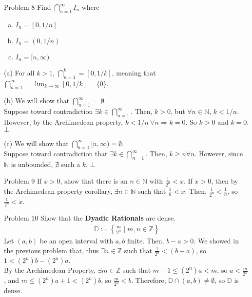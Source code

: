 \documentclass[9pt]{extarticle}
\newcommand{\N}{\mathbb{N}}
\newcommand{\Z}{\mathbb{Z}}
\begin{document}
  \begin{problem}{Problem 8}
    Find $\bigcap_{n = 1}^{\infty} I_n$ where
    \begin{enumerate}[(a)]
      \item $I_n = [0,1/n]$
      \item $I_n = (0,1/n)$
      \item $I_n = [n,\infty)$
    \end{enumerate}
    \tcblower
    \begin{problem}{(a)}
      For all $k > 1$, $\bigcap_{n=1}^{k} = [0,1/k]$, meaning that $\bigcap_{n=1}^{\infty} = \lim_{k\rightarrow\infty}[0,1/k] = \{0\}$.
    \end{problem}
    \begin{problem}{(b)}
      We will show that $\bigcap_{n=1}^{\infty} = \emptyset$.\\

      Suppose toward contradiction $\exists k\in \bigcap_{n=1}^{\infty}$. Then, $k > 0$, but $\forall n\in \N$, $k < 1/n$. However, by the Archimedean property, $k < 1/n~\forall n \Rightarrow k=0$. So $k > 0$ and $k = 0$. $\bot$
    \end{problem}
    \begin{problem}{(c)}
      We will show that $\bigcap_{n=1}^{\infty} [n,\infty) = \emptyset$.\\

      Suppose toward contradiction that $\exists k \in \bigcap_{n=1}^{\infty}$. Then, $k \geq n \forall n$. However, since $\N$ is unbounded, $\nexists$ such a $k$. $\bot$
    \end{problem}
  \end{problem}
  \begin{problem}{Problem 9}
    If $x > 0$, show that there is an $n\in\N$ with $\frac{1}{2^n} < x$.
    \tcblower
    If $x > 0$, then by the Archimedean property corollary, $\exists n\in\N$ such that $\frac{1}{n} < x$. Then, $\frac{1}{2^n} < \frac{1}{n}$, so $\frac{1}{2^n} < x$.
  \end{problem}
  \begin{problem}{Problem 10}
    Show that the \textbf{Dyadic Rationals} are dense.
    \begin{align*}
      \mathbb{D} := \left\{\frac{m}{2^n}\mid m,n\in\Z\right\}
    \end{align*}
    \tcblower
    Let $(a,b)$ be an open interval with $a,b$ finite. Then, $b-a > 0$. We showed in the previous problem that, thus $\exists n\in\Z$ such that $\frac{1}{2^n} < (b-a)$, so $1 < (2^n)b - (2^n)a$.\\

    By the Archimedean Property, $\exists m\in\Z$ such that $m-1 \leq (2^n)a < m$, so $a < \frac{m}{2^n}$, and $m \leq (2^n)a + 1 < (2^n)b$, so $\frac{m}{2^n} < b$. Therefore, $\mathbb{D} \cap (a,b) \neq \emptyset$, so $\mathbb{D}$ is dense.
  \end{problem}
\end{document}
